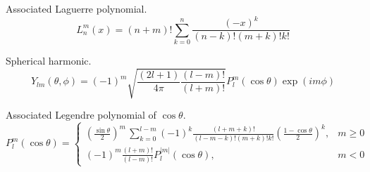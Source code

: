 Associated Laguerre polynomial.
\begin{equation*}
L_n^m(x)=(n+m)!\sum_{k=0}^n\frac{(-x)^k}{(n-k)!(m+k)!k!}
\end{equation*}

Spherical harmonic.
\begin{equation*}
Y_{lm}(\theta,\phi)=(-1)^m
\sqrt{\frac{(2l+1)}{4\pi}
\frac{(l-m)!}{(l+m)!}}
P_l^m(\cos\theta)\exp(im\phi)
\end{equation*}

Associated Legendre polynomial of $\cos\theta$.
\begin{equation*}
P_l^m(\cos\theta)=\begin{cases}
\displaystyle
\left(\frac{\sin\theta}{2}\right)^m\,\sum_{k=0}^{l-m}
(-1)^k\frac{(l+m+k)!}{(l-m-k)!(m+k)!k!}
\left(\frac{1-\cos\theta}{2}\right)^k, & m\ge0
\\[3ex]
\displaystyle
(-1)^m\frac{(l+m)!}{(l-m)!}P_l^{|m|}(\cos\theta), & m<0
\end{cases}
\end{equation*}


